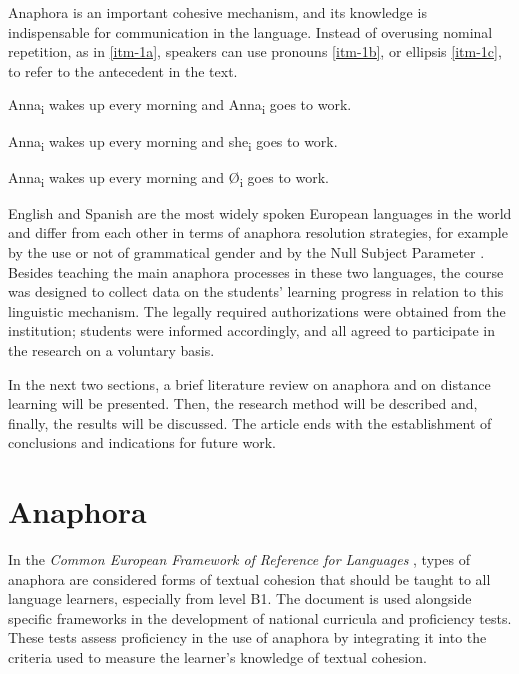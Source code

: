 \documentclass{textolivre}
\begin{document}
Anaphora is an important cohesive mechanism, and its knowledge is indispensable
for communication in the language. Instead of overusing nominal repetition, as
in \ref{itm-1a}, speakers can use pronouns \ref{itm-1b}, or ellipsis \ref{itm-1c}, to refer to the
antecedent in the text.

%
%
\begin{description}[topsep=1ex,partopsep=1ex]
  \item[(1a)\label{itm-1a}] Anna\textsubscript{i} wakes up every morning and Anna\textsubscript{i} goes to work. 
  \item[(1b)\label{itm-1b}] Anna\textsubscript{i} wakes up every morning and she\textsubscript{i} goes to work.
  \item[(1c)\label{itm-1c}] Anna\textsubscript{i} wakes up every morning and Ø\textsubscript{i} goes to work.
\end{description}


English and Spanish are the most widely spoken European languages in the world
\cite{eberhard_ethnologue:_2020} and differ from each other in terms of
anaphora resolution strategies, for example by the use or not of grammatical
gender and by the Null Subject Parameter \cite{chomsky_lectures_1981,rizzi_issues_1982}. Besides
teaching the main anaphora processes in these two languages, the course was
designed to collect data on the students' learning progress in relation to this
linguistic mechanism. The legally required authorizations were obtained from
the institution; students were informed accordingly, and all agreed to
participate in the research on a voluntary basis.

In the next two sections, a brief literature review on anaphora and on distance
learning will be presented. Then, the research method will be described and,
finally, the results will be discussed. The article ends with the establishment
of conclusions and indications for future work.

\section{Anaphora}\label{sec-anaphora}
In the \emph{Common European Framework of Reference for Languages} \cite[p.~140]{council_of_europe_common_2009},
types of anaphora are considered forms of textual cohesion that
should be taught to all language learners, especially from level B1. The
document is used alongside specific frameworks in the development of national
curricula and proficiency tests. These tests assess proficiency in the use of
anaphora by integrating it into the criteria used to measure the learner's
knowledge of textual cohesion.
\end{document}
